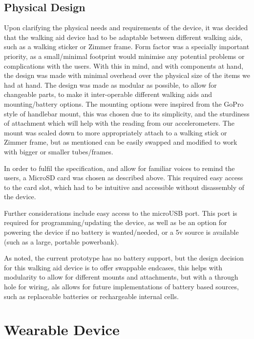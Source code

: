         \subsection{Physical Design}
        \label{subsec:Design_Decisions_walking_aid}

            Upon clarifying the physical needs and requirements of the device, it was decided that the walking aid device had to be adaptable between different walking aids, such as a walking sticker or Zimmer frame. Form factor was a specially important priority, as a small/minimal footprint would minimise any potential problems or complications with the users. With this in mind, and with components at hand, the design was made with minimal overhead over the physical size of the items we had at hand. The design was made as modular as possible, to allow for changeable parts, to make it inter-operable different walking aids and mounting/battery options. The mounting options were inspired from the GoPro style of handlebar mount, this was chosen due to its simplicity, and the sturdiness of attachment which will help with the reading from our accelerometers. The mount was scaled down to more appropriately attach to a walking stick or Zimmer frame, but as mentioned can be easily swapped and modified to work with bigger or smaller tubes/frames.

            In order to fulfil the specification, and allow for familiar voices to remind the users, a MicroSD card was chosen as described above. This required easy access to the card slot, which had to be intuitive and accessible without disassembly of the device.

            Further considerations include easy access to the microUSB port. This port is required for programming/updating the device, as well as be an option for powering the device if no battery is wanted/needed, or a 5v source is available (such as a large, portable powerbank).

            As noted, the current prototype has no battery support, but the design decision for this walking aid device is to offer swappable endcases, this helps with modularity to allow for different mounts and attachments, but with a through hole for wiring, als allows for future implementations of battery based sources, such as replaceable batteries or rechargeable internal cells.
            
    \section{Wearable Device}
    \label{sec:wearabledevice}

